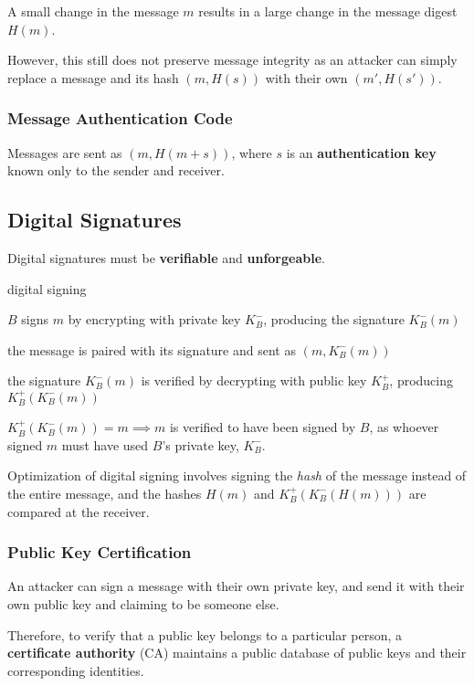 A small change in the message $m$ results in a large change in the message digest $H(m)$.

However, this still does not preserve message integrity as an attacker can simply replace
a message and its hash $(m, H(s))$ with their own $(m', H(s'))$.

\subsubsection{Message Authentication Code}
Messages are sent as $(m, H(m + s))$, where $s$ is an \textbf{authentication key}
known only to the sender and receiver.

\subsection{Digital Signatures}
Digital signatures must be \textbf{verifiable} and \textbf{unforgeable}.

\begin{defn*}{digital signing}
    \begin{enumerate*}
        \item $B$ signs $m$ by encrypting with private key $K_B^-$, producing the signature $K_B^-(m)$
        \item the message is paired with its signature and sent as $(m, K_B^-(m))$
        \item the signature $K_B^-(m)$ is verified by decrypting with public key $K_B^+$, producing $K_B^+(K_B^-(m))$
    \end{enumerate*}
    $K_B^+(K_B^-(m)) = m \implies m$ is verified to have been signed by $B$, as whoever signed $m$
    must have used $B$'s private key, $K_B^-$.
\end{defn*}

Optimization of digital signing involves signing the \textit{hash} of the message instead
of the entire message, and the hashes $H(m)$ and $K_B^+(K_B^-(H(m)))$ are compared at the receiver.

\subsubsection{Public Key Certification}
An attacker can sign a message with their own private key, and send it with their own public key
and claiming to be someone else.

Therefore, to verify that a public key belongs to a particular person, a \textbf{certificate authority} (CA)
maintains a public database of public keys and their corresponding identities.

